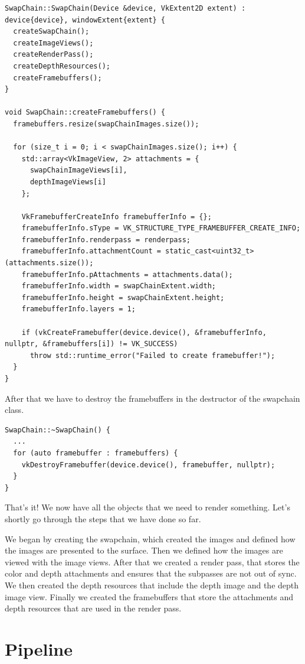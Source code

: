 \documentclass[12pt]{report} \usepackage{preamble}
\begin{document}
\begin{lstlisting}[Language=C++]
SwapChain::SwapChain(Device &device, VkExtent2D extent) : device{device}, windowExtent{extent} {
  createSwapChain();
  createImageViews();
  createRenderPass();
  createDepthResources();
  createFramebuffers();
}

void SwapChain::createFramebuffers() {
  framebuffers.resize(swapChainImages.size());

  for (size_t i = 0; i < swapChainImages.size(); i++) {
    std::array<VkImageView, 2> attachments = {
      swapChainImageViews[i],
      depthImageViews[i]
    };

    VkFramebufferCreateInfo framebufferInfo = {};
    framebufferInfo.sType = VK_STRUCTURE_TYPE_FRAMEBUFFER_CREATE_INFO;
    framebufferInfo.renderpass = renderpass;
    framebufferInfo.attachmentCount = static_cast<uint32_t>(attachments.size());
    framebufferInfo.pAttachments = attachments.data();
    framebufferInfo.width = swapChainExtent.width;
    framebufferInfo.height = swapChainExtent.height;
    framebufferInfo.layers = 1;

    if (vkCreateFramebuffer(device.device(), &framebufferInfo, nullptr, &framebuffers[i]) != VK_SUCCESS)
      throw std::runtime_error("Failed to create framebuffer!");
  }
}
\end{lstlisting}

After that we have to destroy the framebuffers in the destructor of the swapchain class.

\begin{lstlisting}[Language=C++]
SwapChain::~SwapChain() {
  ...
  for (auto framebuffer : framebuffers) {
    vkDestroyFramebuffer(device.device(), framebuffer, nullptr);
  }
}
\end{lstlisting}

That's it! We now have all the objects that we need to render something. Let's shortly go through the steps that we have
done so far.

We began by creating the swapchain, which created the images and defined how the images are presented to the surface.
Then we defined how the images are viewed with the image views. After that we created a render pass, that stores the
color and depth attachments and ensures that the subpasses are not out of sync. We then created the depth resources that
include the depth image and the depth image view. Finally we created the framebuffers that store the attachments and depth
resources that are used in the render pass.

\section{Pipeline}
\end{document}
